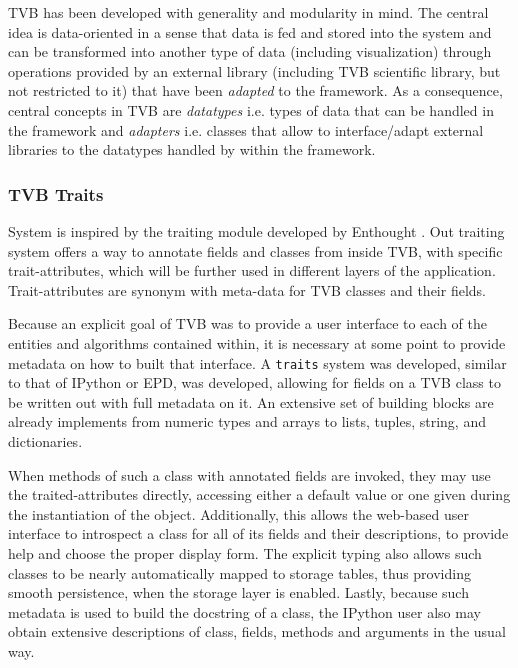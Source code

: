 TVB has been developed with generality and modularity in mind. The central idea is data-oriented in a sense that
data is fed and stored into the system and can be transformed into another type
of data (including visualization) through operations provided by an external
library (including TVB scientific library, but not restricted to it) that have
been \emph{adapted} to the framework. As a consequence, central concepts in TVB
are \emph{datatypes} i.e. types of data that can be handled in the framework and
\emph{adapters} i.e. classes that allow to interface/adapt external libraries
to  the datatypes handled by within the framework.

	\subsubsection{TVB Traits}

System is inspired by the traiting module developed by Enthought \cite{EnthoughtTraits}.
Out traiting system offers a way to annotate fields and classes from inside TVB, with specific trait-attributes,
which will be further used in different layers of the application.
Trait-attributes are synonym with meta-data for TVB classes and their fields.

Because an explicit goal of TVB was to provide a user interface to each of the
entities and algorithms contained within, it is necessary at some point to
provide metadata on how to built that interface. A \texttt{traits} system was developed, similar to that of
IPython or EPD, was developed, allowing for fields on a TVB class to
be written out with full metadata on it. An extensive set of  building 
blocks are already implements from numeric types and arrays to lists, tuples, 
string, and dictionaries.

 When methods of such a class with annotated fields are invoked,
they may use the traited-attributes directly, accessing either a default value
or one given during the instantiation of the object. Additionally, this allows
the web-based user interface to introspect a class for all of its fields and their
descriptions, to provide help and choose the proper display form. The explicit typing also allows
such classes to be nearly automatically mapped to storage tables,
thus providing smooth persistence, when the storage layer is enabled.  
Lastly, because such metadata is used to build the docstring of a class,
the IPython user also may obtain extensive descriptions of class, fields, methods and
arguments in the usual way. 

